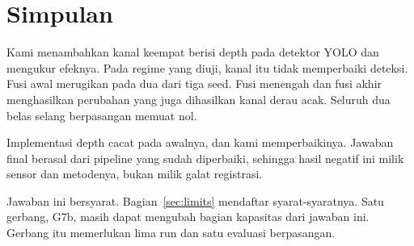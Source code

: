 \documentclass[preprint,12pt]{elsarticle}
\newcommand{\G}[1]{G#1}
\begin{document}
\section{Simpulan}
\label{sec:conclusion}

Kami menambahkan kanal keempat berisi depth pada detektor YOLO dan mengukur
efeknya. Pada regime yang diuji, kanal itu tidak memperbaiki deteksi. Fusi awal
merugikan pada dua dari tiga seed. Fusi menengah dan fusi akhir menghasilkan
perubahan yang juga dihasilkan kanal derau acak. Seluruh dua belas selang
berpasangan memuat nol.

Implementasi depth cacat pada awalnya, dan kami memperbaikinya. Jawaban final
berasal dari pipeline yang sudah diperbaiki, sehingga hasil negatif ini milik
sensor dan metodenya, bukan milik galat registrasi.

Jawaban ini bersyarat. Bagian~\ref{sec:limits} mendaftar syarat-syaratnya. Satu
gerbang, \G{7b}, masih dapat mengubah bagian kapasitas dari jawaban ini.
Gerbang itu memerlukan lima run dan satu evaluasi berpasangan.
\end{document}
